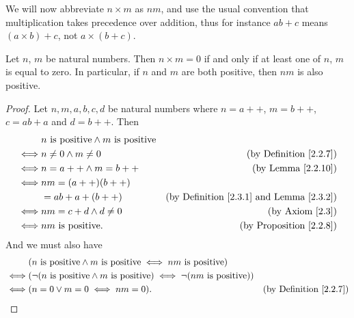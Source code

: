 \begin{note}
    We will now abbreviate \(n \times m\) as \(nm\), and use the usual convention that multiplication takes precedence over addition, thus for instance \(ab + c\) means \((a \times b) + c\), not \(a \times (b + c)\).
\end{note}

\begin{lemma}\label{2.3.3}
    Let \(n\), \(m\) be natural numbers.
    Then \(n \times m = 0\) if and only if at least one of \(n\), \(m\) is equal to zero.
    In particular, if \(n\) and \(m\) are both positive, then \(nm\) is also positive.
\end{lemma}

\begin{proof}
    Let \(n, m, a, b, c, d\) be natural numbers where \(n = a++\), \(m = b++\), \(c = ab + a\) and \(d = b++\).
    Then
    \begin{align*}
             & n \text{ is positive} \land m \text{ is positive}                                                            \\
        \iff & n \neq 0 \land m \neq 0                           & \text{(by Definition \ref{2.2.7})}                       \\
        \iff & n = a++ \land m = b++                             & \text{(by Lemma \ref{2.2.10})}                           \\
        \iff & nm = (a++)(b++)                                                                                              \\
             & = ab + a + (b++)                                  & \text{(by Definition \ref{2.3.1} and Lemma \ref{2.3.2})} \\
        \iff & nm = c + d \land d \neq 0                         & \text{(by Axiom \ref{2.3})}                              \\
        \iff & nm \text{ is positive}.                           & \text{(by Proposition \ref{2.2.8})}
    \end{align*}
    And we must also have
    \begin{align*}
             & (n \text{ is positive} \land m \text{ is positive} \iff nm \text{ is positive})                                                      \\
        \iff & (\lnot (n \text{ is positive} \land m \text{ is positive}) \iff \lnot (nm \text{ is positive}))                                      \\
        \iff & (n = 0 \lor m = 0 \iff nm = 0).                                                                 & \text{(by Definition \ref{2.2.7})}
    \end{align*}
\end{proof}

